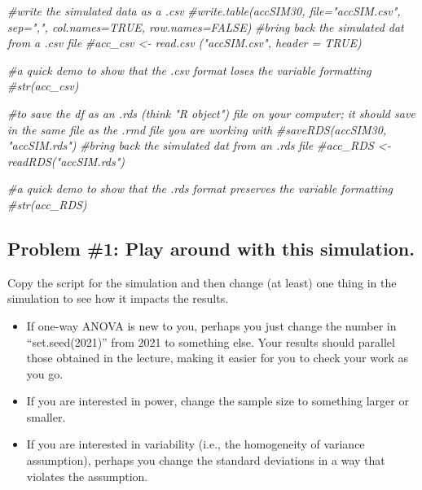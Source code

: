 \documentclass[
  english,
]{book}
\newenvironment{Shaded}{\begin{snugshade}}{\end{snugshade}}
\newcommand{\CommentTok}[1]{\textcolor[rgb]{0.56,0.35,0.01}{\textit{#1}}}
\providecommand{\tightlist}{%
  \setlength{\itemsep}{0pt}\setlength{\parskip}{0pt}}
\begin{document}
\begin{Shaded}
\begin{Highlighting}[]
\CommentTok{\#write the simulated data  as a .csv}
\CommentTok{\#write.table(accSIM30, file="accSIM.csv", sep=",", col.names=TRUE, row.names=FALSE)}
\CommentTok{\#bring back the simulated dat from a .csv file}
\CommentTok{\#acc\_csv \textless{}{-} read.csv ("accSIM.csv", header = TRUE)}
\end{Highlighting}
\end{Shaded}

\begin{Shaded}
\begin{Highlighting}[]
\CommentTok{\#a quick demo to show that the .csv format loses the variable formatting}
\CommentTok{\#str(acc\_csv)}
\end{Highlighting}
\end{Shaded}

\begin{Shaded}
\begin{Highlighting}[]
\CommentTok{\#to save the df as an .rds (think "R object") file on your computer; it should save in the same file as the .rmd file you are working with}
\CommentTok{\#saveRDS(accSIM30, "accSIM.rds")}
\CommentTok{\#bring back the simulated dat from an .rds file}
\CommentTok{\#acc\_RDS \textless{}{-} readRDS("accSIM.rds")}
\end{Highlighting}
\end{Shaded}

\begin{Shaded}
\begin{Highlighting}[]
\CommentTok{\#a quick demo to show that the .rds format preserves the variable formatting}
\CommentTok{\#str(acc\_RDS)}
\end{Highlighting}
\end{Shaded}

\hypertarget{problem-1-play-around-with-this-simulation.}{%
\subsection{Problem \#1: Play around with this simulation.}\label{problem-1-play-around-with-this-simulation.}}

Copy the script for the simulation and then change (at least) one thing in the simulation to see how it impacts the results.

\begin{itemize}
\tightlist
\item
  If one-way ANOVA is new to you, perhaps you just change the number in ``set.seed(2021)'' from 2021 to something else. Your results should parallel those obtained in the lecture, making it easier for you to check your work as you go.
\item
  If you are interested in power, change the sample size to something larger or smaller.
\item
  If you are interested in variability (i.e., the homogeneity of variance assumption), perhaps you change the standard deviations in a way that violates the assumption.
\end{itemize}
\end{document}
